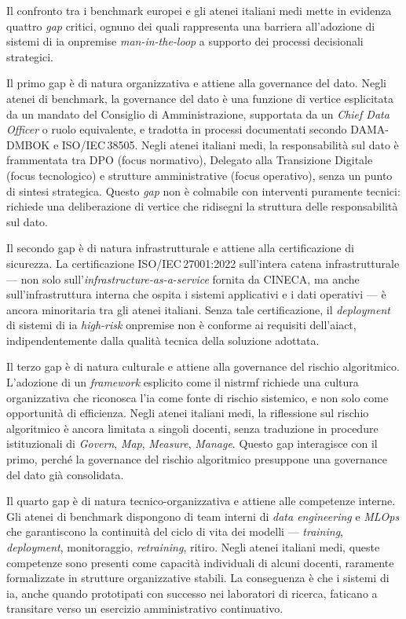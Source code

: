 Il confronto tra i benchmark europei e gli atenei italiani medi mette in evidenza
quattro \textit{gap} critici, ognuno dei quali rappresenta una barriera all'adozione di
sistemi di \gls{ia} \gls{onpremise} \textit{man-in-the-loop} a supporto dei processi
decisionali strategici.

Il primo gap è di natura organizzativa e attiene alla governance del dato.
Negli atenei di benchmark, la governance del dato è una funzione di vertice esplicitata
da un mandato del Consiglio di Amministrazione, supportata da un \textit{Chief Data
Officer} o ruolo equivalente, e tradotta in processi documentati secondo DAMA-DMBOK e
ISO/IEC\,38505. Negli atenei italiani medi, la responsabilità sul dato è frammentata
tra DPO (focus normativo), Delegato alla Transizione Digitale (focus tecnologico) e
strutture amministrative (focus operativo), senza un punto di sintesi strategica.
Questo \textit{gap} non è colmabile con interventi puramente tecnici: richiede una
deliberazione di vertice che ridisegni la struttura delle responsabilità sul dato.

Il secondo gap è di natura infrastrutturale e attiene alla certificazione di
sicurezza. La certificazione ISO/IEC\,27001:2022 sull'intera catena infrastrutturale ---
non solo sull'\textit{infrastructure-as-a-service} fornita da CINECA, ma anche
sull'infrastruttura interna che ospita i sistemi applicativi e i dati operativi --- è
ancora minoritaria tra gli atenei italiani. Senza tale certificazione, il
\textit{deployment} di sistemi di \gls{ia} \textit{high-risk} \gls{onpremise} non è
conforme ai requisiti dell'\gls{aiact}, indipendentemente dalla qualità tecnica della
soluzione adottata.

Il terzo gap è di natura culturale e attiene alla governance del rischio
algoritmico. L'adozione di un \textit{framework} esplicito come il \gls{nistrmf} richiede
una cultura organizzativa che riconosca l'\gls{ia} come fonte di rischio sistemico, e non solo
come opportunità di efficienza. Negli atenei italiani medi, la riflessione sul rischio
algoritmico è ancora limitata a singoli docenti, senza traduzione in procedure
istituzionali di \textit{Govern}, \textit{Map}, \textit{Measure}, \textit{Manage}. Questo
gap interagisce con il primo, perché la governance del rischio algoritmico presuppone
una governance del dato già consolidata.

Il quarto gap è di natura tecnico-organizzativa e attiene alle competenze
interne. Gli atenei di benchmark dispongono di team interni di \textit{data engineering}
e \textit{MLOps} che garantiscono la continuità del ciclo di vita dei modelli ---
\textit{training}, \textit{deployment}, monitoraggio, \textit{retraining}, ritiro. Negli
atenei italiani medi, queste competenze sono presenti come capacità individuali di alcuni
docenti, raramente formalizzate in strutture organizzative stabili. La conseguenza è che
i sistemi di \gls{ia}, anche quando prototipati con successo nei laboratori di ricerca,
faticano a transitare verso un esercizio amministrativo continuativo.

